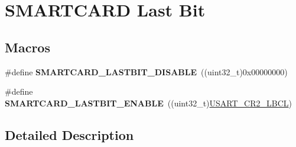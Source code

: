 \hypertarget{group___s_m_a_r_t_c_a_r_d___last___bit}{}\section{S\+M\+A\+R\+T\+C\+A\+RD Last Bit}
\label{group___s_m_a_r_t_c_a_r_d___last___bit}
\subsection*{Macros}
\begin{DoxyCompactItemize}
\item 
\#define {\bfseries S\+M\+A\+R\+T\+C\+A\+R\+D\+\_\+\+L\+A\+S\+T\+B\+I\+T\+\_\+\+D\+I\+S\+A\+B\+LE}~((uint32\+\_\+t)0x00000000)\hypertarget{group___s_m_a_r_t_c_a_r_d___last___bit_ga8ce0dd5ed70e0ce9799c9b056363e884}{}\label{group___s_m_a_r_t_c_a_r_d___last___bit_ga8ce0dd5ed70e0ce9799c9b056363e884}

\item 
\#define {\bfseries S\+M\+A\+R\+T\+C\+A\+R\+D\+\_\+\+L\+A\+S\+T\+B\+I\+T\+\_\+\+E\+N\+A\+B\+LE}~((uint32\+\_\+t)\hyperlink{group___peripheral___registers___bits___definition_ga4a62e93ae7864e89622bdd92508b615e}{U\+S\+A\+R\+T\+\_\+\+C\+R2\+\_\+\+L\+B\+CL})\hypertarget{group___s_m_a_r_t_c_a_r_d___last___bit_ga11edb8d6ed3ba95eade9a1a6d35a2468}{}\label{group___s_m_a_r_t_c_a_r_d___last___bit_ga11edb8d6ed3ba95eade9a1a6d35a2468}

\end{DoxyCompactItemize}


\subsection{Detailed Description}
